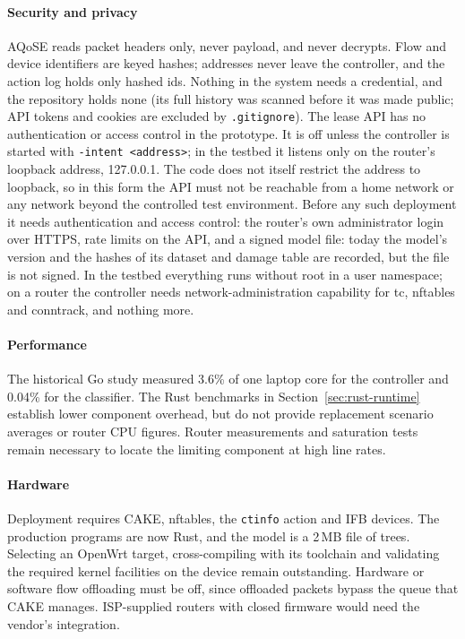 \documentclass[11pt,a4paper]{article}
\begin{document}
\paragraph{Security and privacy} AQoSE reads packet headers only, never payload, and never decrypts. Flow and device identifiers are keyed hashes; addresses never leave the controller, and the action log holds only hashed ids. Nothing in the system needs a credential, and the repository holds none (its full history was scanned before it was made public; API tokens and cookies are excluded by \texttt{.gitignore}). The lease API has no authentication or access control in the prototype. It is off unless the controller is started with \texttt{-intent <address>}; in the testbed it listens only on the router's loopback address, 127.0.0.1. The code does not itself restrict the address to loopback, so in this form the API must not be reachable from a home network or any network beyond the controlled test environment. Before any such deployment it needs authentication and access control: the router's own administrator login over HTTPS, rate limits on the API, and a signed model file: today the model's version and the hashes of its dataset and damage table are recorded, but the file is not signed. In the testbed everything runs without root in a user namespace; on a router the controller needs network-administration capability for tc, nftables and conntrack, and nothing more.

\paragraph{Performance} The historical Go study measured 3.6\% of one laptop core for the controller and 0.04\% for the classifier. The Rust benchmarks in Section~\ref{sec:rust-runtime} establish lower component overhead, but do not provide replacement scenario averages or router CPU figures. Router measurements and saturation tests remain necessary to locate the limiting component at high line rates.

\paragraph{Hardware} Deployment requires CAKE, nftables, the \texttt{ctinfo} action and IFB devices. The production programs are now Rust, and the model is a 2\,MB file of trees. Selecting an OpenWrt target, cross-compiling with its toolchain and validating the required kernel facilities on the device remain outstanding. Hardware or software flow offloading must be off, since offloaded packets bypass the queue that CAKE manages. ISP-supplied routers with closed firmware would need the vendor's integration.
\end{document}
